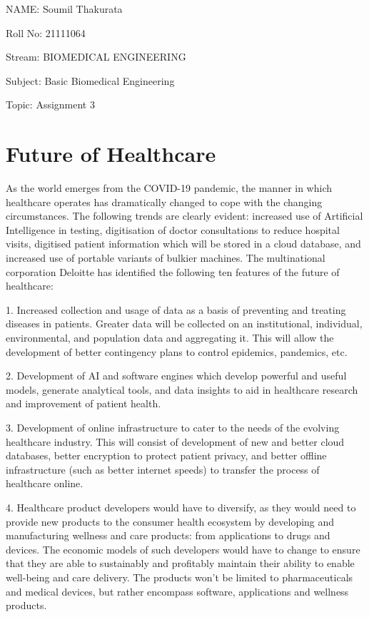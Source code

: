\documentclass[11pt]{article}
\begin{document}
NAME: Soumil Thakurata

Roll No: 21111064

Stream: BIOMEDICAL ENGINEERING

Subject: Basic Biomedical Engineering

Topic: Assignment 3

\pagebreak

\section*{\centering Future of Healthcare}

As the world emerges from the COVID-19 pandemic, the manner in which healthcare operates has dramatically changed to cope with the changing circumstances. The following trends are clearly evident: increased use of Artificial Intelligence in testing, digitisation of doctor consultations to reduce hospital visits, digitised patient information which will be stored in a cloud database, and increased use of portable variants of bulkier machines. The multinational corporation Deloitte has identified the following ten features of the future of healthcare:

1. Increased collection and usage of data as a basis of preventing and treating diseases in patients. Greater data will be collected on an institutional, individual, environmental, and population data and aggregating it. This will allow the development of better contingency plans to control epidemics, pandemics, etc.

2. Development of AI and software engines which develop powerful and useful models, generate analytical tools, and data insights to aid in healthcare research and improvement of patient health.

3. Development of online infrastructure to cater to the needs of the evolving healthcare industry. This will consist of development of new and better cloud databases, better encryption to protect patient privacy, and better offline infrastructure (such as better internet speeds) to transfer the process of healthcare online.

4. Healthcare product developers would have to diversify, as they would need to provide new products to the consumer health ecosystem by developing and manufacturing wellness and care products: from applications to drugs and devices. The economic models of such developers would have to change to ensure that they are able to sustainably and profitably maintain their ability to enable well-being and care delivery. The products won't be limited to pharmaceuticals and medical devices, but rather encompass software, applications and wellness products.
\end{document}
